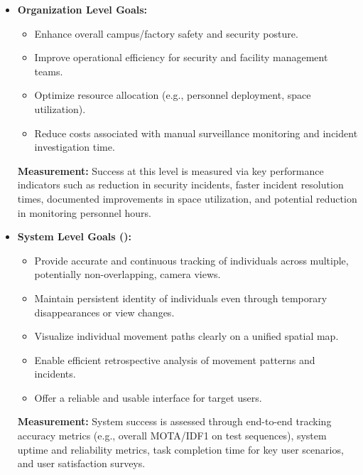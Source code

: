 \begin{itemize}
    \item \textbf{Organization Level Goals:}
        \begin{itemize}
            \item Enhance overall campus/factory safety and security posture.
            \item Improve operational efficiency for security and facility management teams.
            \item Optimize resource allocation (e.g., personnel deployment, space utilization).
            \item Reduce costs associated with manual surveillance monitoring and incident investigation time.
        \end{itemize}
        \textbf{Measurement:} Success at this level is measured via key performance indicators such as reduction in security incidents, faster incident resolution times, documented improvements in space utilization, and potential reduction in monitoring personnel hours.

    \item \textbf{System Level Goals (\usevar{\srsTitle}):}
        \begin{itemize}
            \item Provide accurate and continuous tracking of individuals across multiple, potentially non-overlapping, camera views.
            \item Maintain persistent identity of individuals even through temporary disappearances or view changes.
            \item Visualize individual movement paths clearly on a unified spatial map.
            \item Enable efficient retrospective analysis of movement patterns and incidents.
            \item Offer a reliable and usable interface for target users.
        \end{itemize}
        \textbf{Measurement:} System success is assessed through end-to-end tracking accuracy metrics (e.g., overall MOTA/IDF1 on test sequences), system uptime and reliability metrics, task completion time for key user scenarios, and user satisfaction surveys.


\end{itemize}
